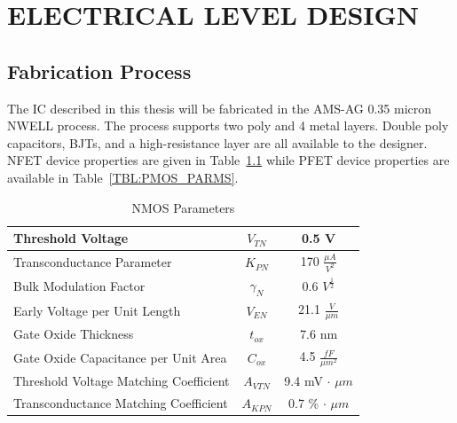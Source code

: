 \documentclass[12pt,oneside,final]{siuethesis}
\theoremstyle{definition}
\begin{document}


\chapter{ELECTRICAL LEVEL DESIGN}

\section{Fabrication Process}

The IC described in this thesis will be fabricated in the AMS-AG 0.35 micron NWELL process.  The process supports two poly and 4 metal layers. Double poly capacitors, BJTs, and a high-resistance layer are all available to the designer. NFET device properties are given in Table~\ref{TBL:NMOS_PARMS} while PFET device properties are available in Table~\ref{TBL:PMOS_PARMS}.


\begin{table} [htbp!]
\begin{center}
\begin{tabular}{| l | c | c |}
\hline 
Threshold Voltage & $V_{TN}$ & 0.5 V \\ 
\hline 
Transconductance Parameter & $K_{PN}$  &  170 $\frac{\mu A}{V^2}$ \\ 
\hline 
Bulk Modulation Factor & $\gamma_{N}$  &  0.6 $V^{\frac{1}{2}}$ \\ 
\hline 
Early Voltage per Unit Length & $V_{EN}$  &  21.1 $\frac{V}{\mu m}$ \\ 
\hline 
Gate Oxide Thickness & $t_{ox}$  &  7.6 nm \\ 
\hline 
Gate Oxide Capacitance per Unit Area & $C_{ox}$  & 4.5 $\frac{fF}{\mu m^2}$ \\ 
\hline 
Threshold Voltage Matching Coefficient & $A_{VTN}$  &  9.4 mV $\cdot$ $\mu m$ \\ 
\hline 
Transconductance Matching Coefficient & $A_{KPN}$  &  0.7 \% $\cdot$ $\mu m$ \\ 
\hline 
\end{tabular} 
\end{center}
\caption{NMOS Parameters}
\label{TBL:NMOS_PARMS}
\end{table}

 
\end{document}

